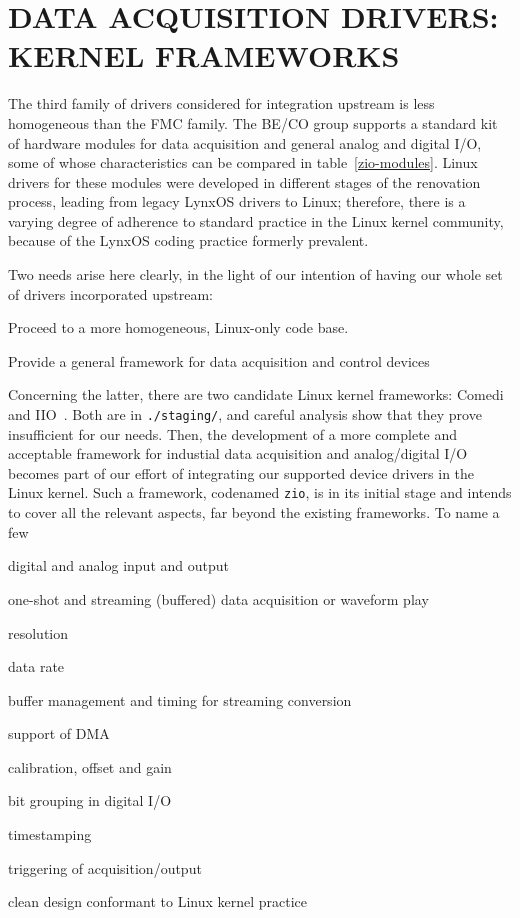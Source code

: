 \documentclass{JAC2003}
\begin{document}
\section{DATA ACQUISITION DRIVERS: KERNEL FRAMEWORKS}

The third family of drivers considered for integration upstream is less
homogeneous than the FMC family. The BE/CO group supports a standard kit
of hardware modules for data acquisition and general analog and digital
I/O, some of whose characteristics can be compared in
table~\ref{zio-modules}. Linux drivers for these modules were developed in
different stages of the renovation process, leading from legacy
LynxOS drivers to Linux; therefore, there is a varying degree of adherence to 
standard practice in the Linux kernel community, because of the
LynxOS coding practice formerly prevalent.

Two needs arise here clearly, in the light of our intention of having
our whole set of drivers incorporated upstream:
\begin{Itemize}
\item Proceed to a more homogeneous, Linux-only code base.
\item Provide a general framework for data acquisition and control
devices
\end{Itemize}
Concerning the latter,
there are two candidate Linux kernel frameworks:
Comedi~\cite{comedi} and IIO~\cite{iio}. Both are in
\texttt{./staging/}, and careful analysis show that they prove
insufficient for our needs. Then, the development of a more complete and
acceptable framework for industial data acquisition and analog/digital
I/O becomes part of our effort of integrating our supported
device drivers in the Linux kernel. Such a framework,
codenamed \texttt{zio}, is in its initial stage and intends to cover
all the relevant aspects, far beyond the existing frameworks. To name a
few
\begin{Itemize}
\item digital and analog input and output
\item one-shot and streaming (buffered) data acquisition or waveform play
\item resolution
\item data rate
\item buffer management and timing for streaming conversion
\item support of DMA
\item calibration, offset and gain
\item bit grouping in digital I/O
\item timestamping
\item triggering of acquisition/output
\item clean design conformant to Linux kernel practice
\end{Itemize}
\end{document}
